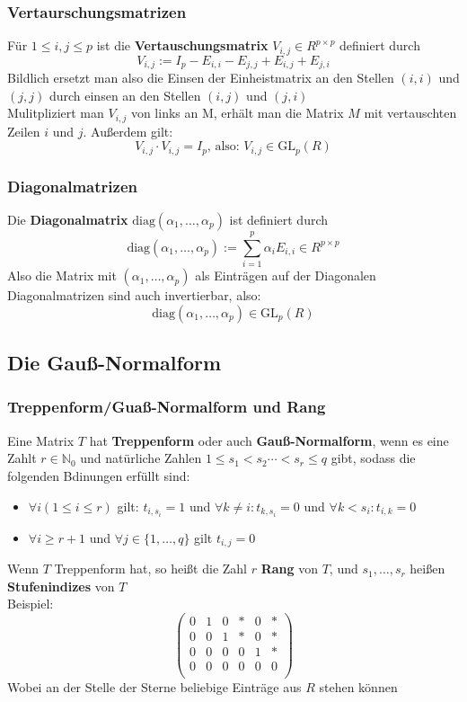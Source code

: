 \documentclass{kit}
\begin{document}
    \subsubsection{Vertaurschungsmatrizen}
      Für $1\le i,j\le p$ ist die \textbf{Vertauschungsmatrix} $V_{i,j}\in R^{p\times p}$ definiert durch
      $$V_{i,j}:=I_p-E_{i,i}-E_{j,j}+E_{i,j}+E_{j,i}$$
      Bildlich ersetzt man also die Einsen der Einheistmatrix an den Stellen $(i,i)$ und $(j,j)$ durch einsen an den Stellen $(i,j)$ und $(j,i)$\\
      Mulitpliziert man $V_{i,j}$ von links an M, erhält man die Matrix $M$ mit vertauschten Zeilen $i$ und $j$. Außerdem gilt:
      $$V_{i,j}\cdot V_{i,j}=I_p\text{, also: }V_{i,j}\in \text{GL}_p(R)$$
    \subsubsection{Diagonalmatrizen}
      Die \textbf{Diagonalmatrix} $\text{diag}(\alpha_1,\dots,\alpha_p)$ ist definiert durch
      $$\text{diag}(\alpha_1,\dots,\alpha_p):=\sum_{i=1}^p\alpha_iE_{i,i}\in R^{p\times p}$$
      Also die Matrix mit $(\alpha_1,\dots,\alpha_p)$ als Einträgen auf der Diagonalen\\
      Diagonalmatrizen sind auch invertierbar, also:
      $$\text{diag}(\alpha_1,\dots,\alpha_p)\in \text{GL}_p(R)$$
  \subsection{Die Gauß-Normalform}
    \subsubsection{Treppenform/Guaß-Normalform und Rang}
      Eine Matrix $T$ hat \textbf{Treppenform} oder auch \textbf{Gauß-Normalform}, wenn es eine Zahlt $r\in\mathbb{N}_0$ und natürliche Zahlen $1\le s_1<s_2\cdots<s_r\le q$ gibt, sodass die folgenden Bdinungen erfüllt sind:
      \begin{itemize}
        \item $\forall i(1\le i\le r)$ gilt: $t_{i,s_i}=1$ und $\forall k\neq i:t_{k,s_i}=0$ und $\forall k<s_i:t_{i,k}=0$  
        \item $\forall i\ge r+1$ und $\forall j\in\{1,\dots,q\}$ gilt $t_{i,j}=0$
      \end{itemize}
      Wenn $T$ Treppenform hat, so heißt die Zahl $r$ \textbf{Rang} von $T$, und $s_1,\dots,s_r$ heißen \textbf{Stufenindizes} von $T$\\
      Beispiel:
      $$\begin{pmatrix}
        0 & 1 & 0 & * & 0 & *\\
        0 & 0 & 1 & * & 0 & *\\
        0 & 0 & 0 & 0 & 1 & *\\
        0 & 0 & 0 & 0 & 0 & 0\\
      \end{pmatrix}$$
      Wobei an der Stelle der Sterne beliebige Einträge aus $R$ stehen können
\end{document}
